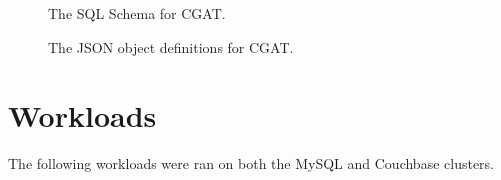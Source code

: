 \documentclass[]{IEEEtran}
\begin{document}
\clearpage
\begin{figure}%
{%
\setlength{\fboxsep}{0pt}%
\setlength{\fboxrule}{1pt}%
%
}%
\caption{The SQL Schema for CGAT.}
\label{fig:SQLDiagram}
\end{figure}%

\clearpage
\begin{figure}%
{%
\setlength{\fboxsep}{0pt}%
\setlength{\fboxrule}{1pt}%
%
}%
\caption{The JSON object definitions for CGAT.}
\label{fig:JSON}
\end{figure}%

\clearpage
\section{Workloads}
The following workloads were ran on both the MySQL and Couchbase clusters.
\end{document}
